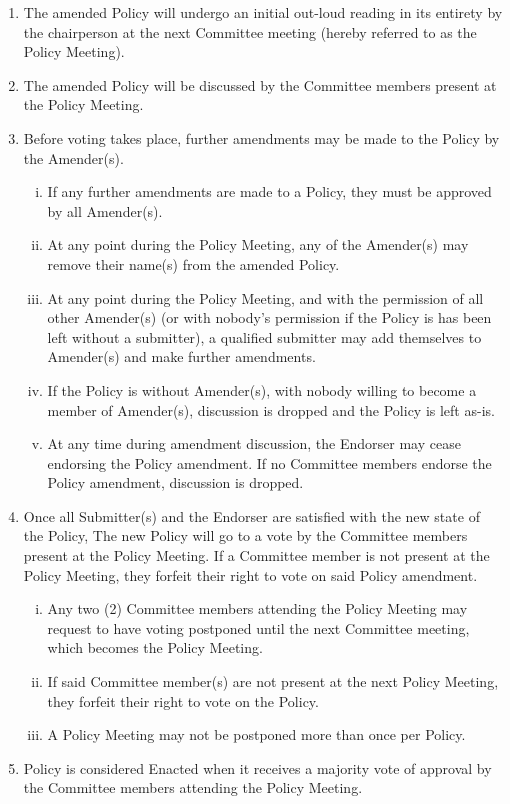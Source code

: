 \documentclass[a4paper,12pt]{article}
\begin{document}
\begin{enumerate}[1)]
    \item The amended Policy will undergo an initial out-loud reading in its entirety by the chairperson at the next Committee meeting (hereby referred to as the Policy Meeting).
    \item The amended Policy will be discussed by the Committee members present at the Policy Meeting.
    \item Before voting takes place, further amendments may be made to the Policy by the Amender(s).
    \begin{enumerate}[i)]
        \item If any further amendments are made to a Policy, they must be approved by all Amender(s).
        \item At any point during the Policy Meeting, any of the Amender(s) may remove their name(s) from the amended Policy.
        \item At any point during the Policy Meeting, and with the permission of all other Amender(s) (or with nobody's permission if the Policy is has been left without a submitter), a qualified submitter may add themselves to Amender(s) and make further amendments.
        \item If the Policy is without Amender(s), with nobody willing to become a member of Amender(s), discussion is dropped and the Policy is left as-is.
        \item At any time during amendment discussion, the Endorser may cease endorsing the Policy amendment. If no Committee members endorse the Policy amendment, discussion is dropped.
    \end{enumerate}
    \item Once all Submitter(s) and the Endorser are satisfied with the new state of the Policy, The new Policy will go to a vote by the Committee members present at the Policy Meeting. If a Committee member is not present at the Policy Meeting, they forfeit their right to vote on said Policy amendment.
    \begin{enumerate}[i)]
        \item Any two (2) Committee members attending the Policy Meeting may request to have voting postponed until the next Committee meeting, which becomes the Policy Meeting.
        \item If said Committee member(s) are not present at the next Policy Meeting, they forfeit their right to vote on the Policy.
        \item A Policy Meeting may not be postponed more than once per Policy.
    \end{enumerate}
    \item Policy is considered Enacted when it receives a majority vote of approval by the Committee members attending the Policy Meeting.
\end{enumerate}
\end{document}
